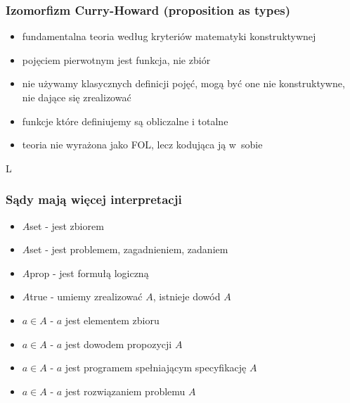 \documentclass{beamer}
\begin{document}
\begin{frame}
\frametitle{Izomorfizm Curry-Howard (proposition as types)}

\begin{itemize}
 \item fundamentalna teoria według kryteriów matematyki konstruktywnej
 \item pojęciem pierwotnym jest funkcja, nie zbiór
 \item nie używamy klasycznych definicji pojęć, mogą być one nie konstruktywne, nie dające się zrealizować
 \item funkcje które definiujemy są obliczalne i totalne
 \item teoria nie wyrażona jako FOL, lecz kodująca ją w~sobie
\end{itemize}
\end{frame}
L
\begin{frame}
\frametitle{Sądy mają więcej interpretacji}

\begin{itemize}
 \item $A$\;set -  jest zbiorem
 \item $A$\;set -  jest problemem, zagadnieniem, zadaniem
 \item $A$\;prop - jest formułą logiczną
 \item $A$\;true - umiemy zrealizować $A$, istnieje dowód $A$
 \item $a \in A$ - $a$ jest elementem zbioru
 \item $a \in A$ - $a$ jest dowodem propozycji $A$
 \item $a \in A$ - $a$ jest programem spełniającym specyfikację $A$
 \item $a \in A$ - $a$ jest rozwiązaniem problemu $A$
\end{itemize}
\end{frame}

\end{document}
